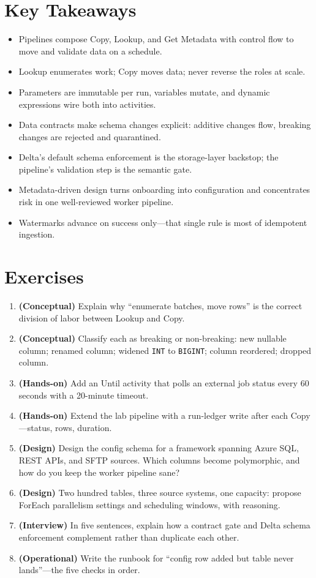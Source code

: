 \section*{Key Takeaways}
\begin{itemize}
    \item Pipelines compose Copy, Lookup, and Get Metadata with control flow to move and validate data on a schedule.
    \item Lookup enumerates work; Copy moves data; never reverse the roles at scale.
    \item Parameters are immutable per run, variables mutate, and dynamic expressions wire both into activities.
    \item Data contracts make schema changes explicit: additive changes flow, breaking changes are rejected and quarantined.
    \item Delta's default schema enforcement is the storage-layer backstop; the pipeline's validation step is the semantic gate.
    \item Metadata-driven design turns onboarding into configuration and concentrates risk in one well-reviewed worker pipeline.
    \item Watermarks advance on success only---that single rule is most of idempotent ingestion.
\end{itemize}

\section{Exercises}
\begin{enumerate}
    \item \textbf{(Conceptual)} Explain why ``enumerate batches, move rows'' is the correct division of labor between Lookup and Copy.
    \item \textbf{(Conceptual)} Classify each as breaking or non-breaking: new nullable column; renamed column; widened \texttt{INT} to \texttt{BIGINT}; column reordered; dropped column.
    \item \textbf{(Hands-on)} Add an Until activity that polls an external job status every 60 seconds with a 20-minute timeout.
    \item \textbf{(Hands-on)} Extend the lab pipeline with a run-ledger write after each Copy---status, rows, duration.
    \item \textbf{(Design)} Design the config schema for a framework spanning Azure SQL, REST APIs, and SFTP sources. Which columns become polymorphic, and how do you keep the worker pipeline sane?
    \item \textbf{(Design)} Two hundred tables, three source systems, one capacity: propose ForEach parallelism settings and scheduling windows, with reasoning.
    \item \textbf{(Interview)} In five sentences, explain how a contract gate and Delta schema enforcement complement rather than duplicate each other.
    \item \textbf{(Operational)} Write the runbook for ``config row added but table never lands''---the five checks in order.
\end{enumerate}

